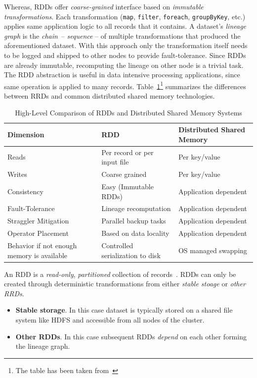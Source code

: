 Whereas, RDDs offer \emph{coarse-grained} interface based on \emph{immutable transformations}. Each transformation (\lstinline$map$, \lstinline$filter$, \lstinline$foreach$, \lstinline$groupByKey$, etc.) applies same application logic to all records that it contains. A dataset's \emph{lineage graph} is the \emph{chain}~-- \emph{sequence} -- of multiple transformations that produced the aforementioned dataset. With this approach only the transformation itself needs to be logged and shipped to other nodes to provide fault-tolerance. Since RDDs are already immutable, recomputing the lineage on other node is a trivial task. The RDD abstraction is useful in data intensive processing applications, since same operation is applied to many records. Table~\ref{tab:rdd-vs-dsm}\footnote{The table has been taken from~\textcite{Zaharia:2012}} summarizes the differences between RRDs and common distributed shared memory technologies.
\begin{table}[h]
    \begin{tabular}{lll}
        \toprule
        \textbf{Dimension} & \textbf{RDD} & \textbf{Distributed Shared Memory}\\
        \midrule
        Reads & Per record or per input file & Per key/value \\
        Writes & Coarse grained & Per key/value \\
        Consistency & Easy (Immutable RDDs) & Application dependent \\
        Fault-Tolerance & Lineage recomputation & Application dependent \\
        Straggler Mitigation & Parallel backup tasks & Application dependent \\
        Operator Placement & Based on data locality & Application dependent \\
        Behavior if not enough memory is available & Controlled serialization to disk & OS managed swapping\\
        \bottomrule
    \end{tabular}
    \centering
    \caption{High-Level Comparison of RDDs and Distributed Shared Memory Systems}
    \label{tab:rdd-vs-dsm}
\end{table}

An RDD is a \emph{read-only}, \emph{partitioned} collection of records~\cite{Zaharia:2012}. RDDs can only be created through deterministic transformations from either \emph{stable stoage} or \emph{other RRDs}.
\begin{itemize}
    \item \textbf{Stable storage}. In this case dataset is typically stored on a shared file system like HDFS and accessible from all nodes of the cluster.
    \item \textbf{Other RDDs}. In this case subsequent RDDs \emph{depend} on each other forming the lineage graph.
\end{itemize}


